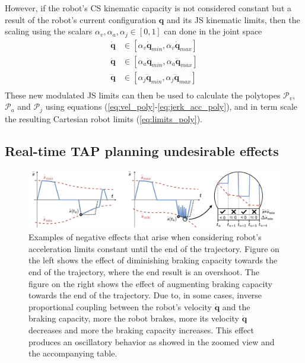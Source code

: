 However, if the robot's CS kinematic capacity is not considered constant but a result of the robot's current configuration $\bm{q}$ and its JS kinematic limits, then the scaling using the scalars $\alpha_v,\alpha_a,\alpha_j\in[0,1]$ can done in the joint space
\begin{equation}
\begin{split}
\dot{\bm{q}}&\in  [\alpha_v\dot{\bm{q}}_{min},\alpha_v\dot{\bm{q}}_{max}] \\
\ddot{\bm{q}}&\in  [\alpha_a\ddot{\bm{q}}_{min},\alpha_a\ddot{\bm{q}}_{max}] \\
\dddot{\bm{q}}&\in  [\alpha_j\dddot{\bm{q}}_{min},\alpha_j\dddot{\bm{q}}_{max}] \\
 \end{split} \label{eq:limits_cs_alpha}
\end{equation}
These new modulated JS limits can then be used to calculate the polytopes $\mathcal{P}_v$,$\mathcal{P}_a$ and $\mathcal{P}_j$ using equations (\ref{eq:vel_poly}-\ref{eq:jerk_acc_poly}), and in term scale the resulting Cartesian robot limits (\ref{eq:limits_poly}).


\subsection{Real-time TAP planning undesirable effects}
\label{ch:heuristics}

\begin{figure}[tb!]
    \centering
    \includegraphics[width=\linewidth]{Papers/imgs/heuristics.png}
    \caption{Examples of negative effects that arise when considering robot's acceleration limits constant until the end of the trajectory. Figure on the left shows the effect of diminishing braking capacity towards the end of the trajectory, where the end result is an overshoot. The figure on the right shows the effect of augmenting braking capacity towards the end of the trajectory. Due to, in some cases, inverse proportional coupling between the robot's velocity $\dot{\bm{q}}$ and the braking capacity, more the robot brakes, more its velocity $\dot{\bm{q}}$ decreases and more the braking capacity increases. This effect produces an oscillatory behavior as showed in the zoomed view and the accompanying table. }
    \label{fig:overshoot_shema}
\end{figure}

